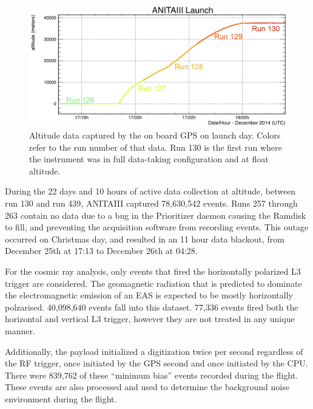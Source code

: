 \begin{figure}
	\centering
	\includegraphics[width=\textwidth]{figures/LaunchAltitude}
	\caption{Altitude data captured by the on board GPS on launch day.  Colors refer to the run number of that data.  Run 130 is the first run where the instrument was in full data-taking configuration and at float altitude.}
	\label{fig:AnitaLaunchAltitude}
\end{figure}	

		During the 22 days and 10 hours of active data collection at altitude, between run 130 and run 439, ANITAIII captured 78,630,542 events.  Runs 257 through 263 contain no data due to a bug in the Prioritizer daemon causing the Ramdisk to fill, and preventing the acquisition software from recording events.  This outage occurred on Christmas day, and resulted in an 11 hour data blackout, from December 25th at 17:13 to December 26th at 04:28.
		
		For the cosmic ray analysis, only events that fired the horizontally polarized L3 trigger are considered. The geomagnetic radiation that is predicted to dominate the electromagnetic emission of an EAS is expected to be mostly horizontally polzarised. 40,098,640 events fall into this dataset.  77,336 events fired both the horizontal and vertical L3 trigger, however they are not treated in any unique manner.
		
		Additionally, the payload initialized a digitization twice per second regardless of the RF trigger, once initiated by the GPS second and once initiated by the CPU.  There were 839,762 of these ``minimum bias'' events recorded during the flight.  These events are also processed and used to determine the background noise environment during the flight.
		
	
